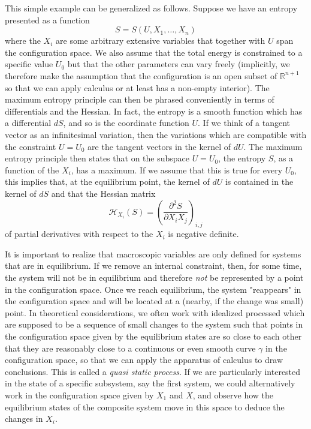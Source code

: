 \documentclass[a4paper, draft]{article}
\theoremstyle{own}
\theoremstyle{remark}
\newcommand{\R}{\mathbb{R}}
\begin{document}
This simple example can be generalized as follows. Suppose we have an entropy presented as a function 
$$
S = S(U, X_1, \dots, X_n)
$$
where the $X_i$ are some arbitrary extensive variables that together with $U$ span the configuration space. We also assume that the total energy is constrained to a specific value $U_0$ but that the other parameters can vary freely (implicitly, we therefore make the assumption that the configuration is an open subset of $\R^{n+1}$  so that we can apply calculus or at least has a non-empty interior). The maximum entropy principle can then be phrased conveniently in terms of differentials and the Hessian. In fact, the entropy is a smooth function which has a differential $dS$, and so is the coordinate function $U$. If we think of a tangent vector as an infinitesimal variation, then the variations which are compatible with the constraint $U = U_0$ are the tangent vectors in the kernel of $dU$. The maximum entropy principle then states that on the subspace $U = U_0$, the entropy $S$, as a function of the $X_i$, has a maximum. If we assume that this is true for every $U_0$, this implies that, at the equilibrium point, the kernel of $dU$ is contained in the kernel of $dS$ and that the Hessian matrix
$$
{\mathcal H}_{X_i}(S) = (\frac{\partial^2 S}{\partial X_i X_j})_{i,j}
$$
of partial derivatives with respect to the $X_i$ is negative definite.


It is important to realize that macroscopic variables are only defined for systems that are in equilibrium. If we remove an internal constraint,  then, for some time, the system will not be in equilibrium and therefore {\em not} be represented by a point in the configuration space. Once we reach equilibrium, the system "reappears" in the configuration space and will be located at a (nearby, if the change was small) point. In theoretical considerations, we often work with idealized processed which are supposed to be a sequence of small changes to the system such that points in the configuration space given by the equilibrium states are so close to each other that they are reasonably close to a continuous or even smooth curve $\gamma$ in the configuration space, so that we can apply the apparatus of calculus to draw conclusions. This is called a {\em quasi static process}. If we are particularly interested in the state of a specific subsystem, say the first system, we could alternatively work in the configuration space given by $X_1$ and $X$, and observe how the equilibrium states of the composite system move in this space to deduce the changes in $X_i$.
\end{document}
